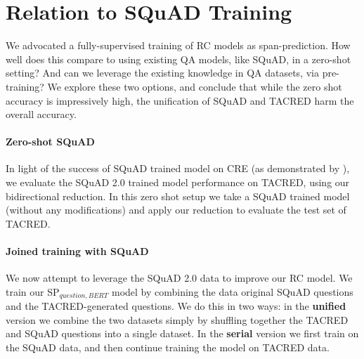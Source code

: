 \documentclass[11pt]{article}
\begin{document}
\begin{table}[t]
\caption{{\bf Using SQuAD 2.0} Top: Evaluating SQuAD 2.0 QA model on TACRED in a zero-shot setup, using our bidirectional SP reduction. Mid:
``Fine-tuning'' the SP$_{question,BERT}$ models on TACRED after SQuAD 2.0 per-training. Bottom: The SP model trained with out pre-training, significantly outperforming the pre-trained variants.}
\label{tab:unified}
\end{table}


\section{Relation to SQuAD Training}

We advocated a fully-supervised training of RC models as span-prediction. How well does this compare to using existing QA models, like SQuAD, in a zero-shot setting? And can we leverage the existing knowledge in QA datasets, via pre-training? We explore these two options, and conclude that while the zero shot accuracy is impressively high, the unification of SQuAD and TACRED harm the overall accuracy. 

\paragraph{Zero-shot SQuAD} In light of the success of SQuAD trained model on CRE (as demonstrated by \citet{Rosenman2020}), we evaluate the SQuAD 2.0 trained model performance on TACRED, using our bidirectional reduction. In this zero shot setup we take a SQuAD trained model (without any modifications) and apply our reduction to evaluate the test set of TACRED.

\paragraph{Joined training with SQuAD}
We now attempt to leverage the SQuAD 2.0 data  to improve our RC model. We train our SP$_{question,BERT}$ model by combining the data original SQuAD questions and the TACRED-generated questions. We do this in two ways: in the \textbf{unified} version we combine the two datasets simply by shuffling together the TACRED and SQuAD questions into a single dataset. In the \textbf{serial} version we first train on the SQuAD data, and then continue training the model on TACRED data.
\end{document}
